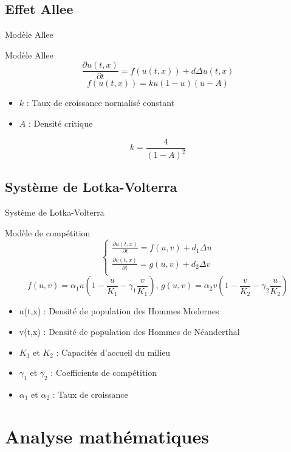 \documentclass[10pt]{beamer}
\begin{document}
\subsection{Effet Allee}
\begin{frame}{Modèle Allee}{}
\begin{block}{Modèle Allee}
	$$\frac{\partial u(t,x)}{\partial t}=f(u(t,x))+d\Delta u(t,x)$$
	$$f(u(t,x))=ku(1-u)(u-A)$$
\end{block}
\begin{itemize}
    \item $k$ : Taux de croissance normalisé constant 
    \item $A$ : Densité critique
\end{itemize}
$$k=\frac{4}{(1-A)^2}$$
\end{frame}

\subsection{Système de Lotka-Volterra}
\begin{frame}{Système de Lotka-Volterra}{}
\begin{block}{Modèle de compétition}
	$$\begin{cases} \frac{\partial u(t,x)}{\partial t} = f(u,v) + d_1\Delta u\\ \frac{\partial v(t,x)}{\partial t} = g(u,v) + d_2 \Delta v \\ 
\end{cases}$$
	$$f(u,v) = \alpha_1 u\left(1-\frac{u}{K_1}-\gamma_1\frac{v}{K_1}\right) \text{, } g(u,v) = \alpha_2 v\left(1-\frac{v}{K_2}-\gamma_2\frac{u}{K_2}\right)$$
\end{block}
\begin{itemize}
	\item u(t,x) : Densité de population des Hommes Modernes 
    \item v(t,x) : Densité de population des Hommes de Néanderthal 
    \item $K_1$ et $K_2$ : Capacités d'accueil du milieu
    \item $\gamma_1$ et $\gamma_2$ : Coefficients de compétition
    \item $\alpha_1$ et $\alpha_2$ : Taux de croissance
\end{itemize}
\end{frame}

\section{Analyse mathématiques}
\end{document}
